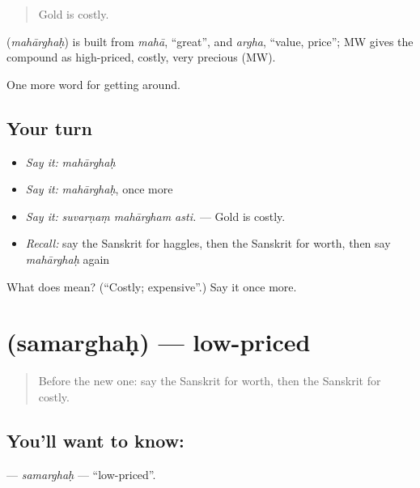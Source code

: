 \begin{quote}
Gold is costly.
\end{quote}

\begin{cousinweb}
\textbf{} (\emph{mahārghaḥ}) is built from \emph{mahā}, \textquotedblleft{}great\textquotedblright{}, and \emph{argha}, \textquotedblleft{}value, price\textquotedblright{}; MW gives the compound as high-priced, costly, very precious (MW).
\end{cousinweb}

\begin{grammarlens}[title={What you've built}]
One more word for getting around.
\end{grammarlens}

\subsection*{Your turn}
\begin{itemize}
\raggedright
  \item \emph{Say it:} \emph{mahārghaḥ}
  \item \emph{Say it:} \emph{mahārghaḥ}, once more
  \item \emph{Say it:} \emph{suvarṇaṃ mahārgham asti.} — Gold is costly.
  \item \emph{Recall:} say the Sanskrit for haggles, then the Sanskrit for worth, then say \emph{mahārghaḥ} again
\end{itemize}

\begin{tcolorbox}[breakable,colback=teal!4,colframe=teal!35!black,title={Before you move on}]
What does  mean? (\textquotedblleft{}Costly; expensive\textquotedblright{}.) Say it once more.
\end{tcolorbox}
\section[\texorpdfstring{\sk{समर्घः} (samarghaḥ)}{समर्घः (samarghaḥ)}]{ (samarghaḥ) — low-priced}

\label{lesson:SA-C431-samarghah}



\begin{quote}
Before the new one: say the Sanskrit for worth, then the Sanskrit for costly.
\end{quote}

\subsection*{You'll want to know: }
\textbf{} — \emph{samarghaḥ} — \textquotedblleft{}low-priced\textquotedblright{}.

